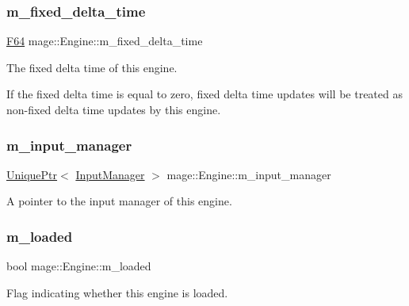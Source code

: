 \subsubsection{\texorpdfstring{m\+\_\+fixed\+\_\+delta\+\_\+time}{m\_fixed\_delta\_time}}
{\footnotesize\ttfamily \hyperlink{namespacemage_ad26233bbec640deda836e572c1a23708}{F64} mage\+::\+Engine\+::m\+\_\+fixed\+\_\+delta\+\_\+time\hspace{0.3cm}{\ttfamily [private]}}

The fixed delta time of this engine.

If the fixed delta time is equal to zero, fixed delta time updates will be treated as non-\/fixed delta time updates by this engine. \hypertarget{classmage_1_1_engine_a8e9048208a6a5c5b034aaa1cbdab28bc}{}\label{classmage_1_1_engine_a8e9048208a6a5c5b034aaa1cbdab28bc} 
\subsubsection{\texorpdfstring{m\+\_\+input\+\_\+manager}{m\_input\_manager}}
{\footnotesize\ttfamily \hyperlink{namespacemage_a3316d7143a973e37adf1110f2e80ca31}{Unique\+Ptr}$<$ \hyperlink{classmage_1_1_input_manager}{Input\+Manager} $>$ mage\+::\+Engine\+::m\+\_\+input\+\_\+manager\hspace{0.3cm}{\ttfamily [private]}}

A pointer to the input manager of this engine. \hypertarget{classmage_1_1_engine_a2f8783761b9629dd507d0a6bc456125b}{}\label{classmage_1_1_engine_a2f8783761b9629dd507d0a6bc456125b} 
\subsubsection{\texorpdfstring{m\+\_\+loaded}{m\_loaded}}
{\footnotesize\ttfamily bool mage\+::\+Engine\+::m\+\_\+loaded\hspace{0.3cm}{\ttfamily [private]}}

Flag indicating whether this engine is loaded. \hypertarget{classmage_1_1_engine_a3aea7e8c0c1247cac570334a3d3543d6}{}\label{classmage_1_1_engine_a3aea7e8c0c1247cac570334a3d3543d6} 
